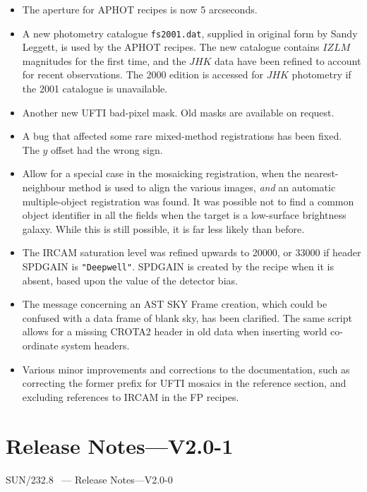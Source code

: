 \documentclass[twoside,11pt]{article}
\newcommand{\stardocinitials}  {SUN}
\newcommand{\stardocnumber}    {232.8}
\newcommand{\stardocname}{\stardocinitials /\stardocnumber}
\newcommand{\xlabel}[1]{}
\renewcommand{\_}{\texttt{\symbol{95}}}
\begin{document}
\begin{itemize}
   \item The aperture for \_APHOT recipes is now 5 arcseconds.
   \item A new photometry catalogue {\tt fs2001.dat}, supplied in
      original form by Sandy Leggett, is used by the \_APHOT recipes.
      The new catalogue contains $IZLM$ magnitudes for the first time,
      and the $JHK$ data have been refined to account for recent
      observations.  The 2000 edition is accessed for $JHK$ photometry
      if the 2001 catalogue is unavailable. 
   \item Another new UFTI bad-pixel mask.  Old masks are available on
      request.
   \item A bug that affected some rare mixed-method registrations has
      been fixed.  The $y$ offset had the wrong sign.
   \item Allow for a special case in the mosaicking registration, when
      the nearest-neighbour method is used to align the various images,
      {\em{and}} an automatic multiple-object registration was found.
      It was possible not to find a common object identifier in all
      the fields when the target is a low-surface brightness galaxy.
      While this is still possible, it is far less likely than before.
   \item The IRCAM saturation level was refined upwards to 20000, or
      33000 if header SPD\_GAIN is {\tt{"Deepwell"}}.  SPD\_GAIN
      is created by the recipe when it is absent, based upon the value
      of the detector bias.
   \item The message concerning an AST SKY Frame creation,
      which could be confused with a data frame of blank sky, has been
      clarified.  The same script allows for a missing CROTA2 header
      in old data when inserting world co-ordinate system headers.
   \item Various minor improvements and corrections to the
      documentation, such as correcting the former prefix for UFTI
      mosaics in the reference section, and excluding references to
      IRCAM in the FP recipes.
\end{itemize}


\section{\xlabel{se_changes2p0}Release Notes---V2.0-1\label{se_changes2p0}}
\markboth{{\stardocname}~ --- Release Notes---V2.0-0}
{{\stardocname}~ --- Release Notes---V2.0-0}
\end{document}
